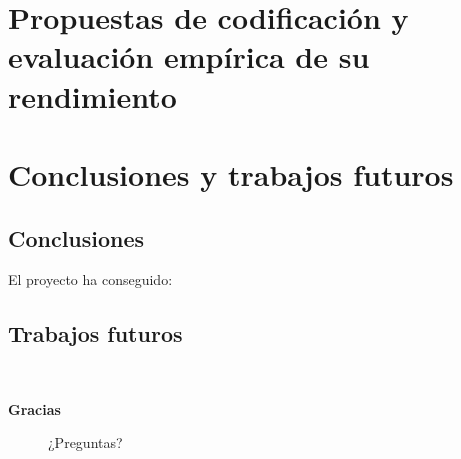 \documentclass[compress]{beamer}
\begin{document}
	\section{Propuestas de codificación y evaluación empírica de su rendimiento}


\section{Conclusiones y trabajos futuros}
\subsection{Conclusiones}
\begin{frame}{}
		El proyecto ha conseguido:
	
\end{frame}


\subsection{Trabajos futuros}
\begin{frame}{}
	\
\end{frame}


\begin{frame}
	\centering \textbf{Gracias}

	\begin{figure}[H,font=\Small]
		\centering
		\label{fig:calidad}
		
		¿Preguntas?
		
	\end{figure}
	
	
\end{frame}
\end{document}
